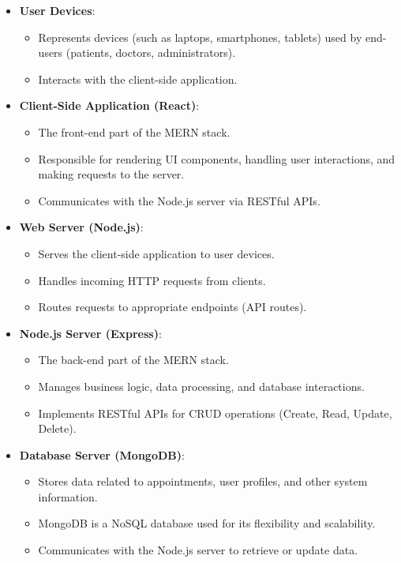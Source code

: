 \documentclass[a4paper, 12pt]{article}
\begin{document}
\begin{itemize}
    \item \textbf{User Devices}:
    \begin{itemize}
        \item Represents devices (such as laptops, smartphones, tablets) used by end-users (patients, doctors, administrators).
        \item Interacts with the client-side application.
    \end{itemize}
    
    \item \textbf{Client-Side Application (React)}:
    \begin{itemize}
        \item The front-end part of the MERN stack.
        \item Responsible for rendering UI components, handling user interactions, and making requests to the server.
        \item Communicates with the Node.js server via RESTful APIs.
    \end{itemize}
    
    \item \textbf{Web Server (Node.js)}:
    \begin{itemize}
        \item Serves the client-side application to user devices.
        \item Handles incoming HTTP requests from clients.
        \item Routes requests to appropriate endpoints (API routes).
    \end{itemize}
    
    \item \textbf{Node.js Server (Express)}:
    \begin{itemize}
        \item The back-end part of the MERN stack.
        \item Manages business logic, data processing, and database interactions.
        \item Implements RESTful APIs for CRUD operations (Create, Read, Update, Delete).
    \end{itemize}
    
    \item \textbf{Database Server (MongoDB)}:
    \begin{itemize}
        \item Stores data related to appointments, user profiles, and other system information.
        \item MongoDB is a NoSQL database used for its flexibility and scalability.
        \item Communicates with the Node.js server to retrieve or update data.
    \end{itemize}
    

\end{itemize}
\end{document}

